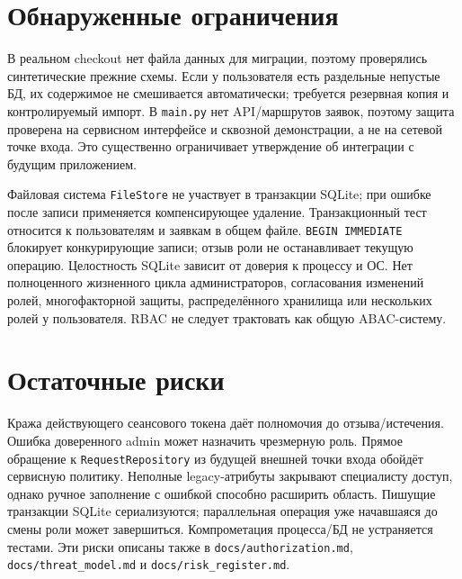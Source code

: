 \documentclass[12pt,a4paper]{article}
\begin{document}
\section{Обнаруженные ограничения}
В реальном checkout нет файла данных для миграции, поэтому проверялись синтетические прежние схемы. Если у пользователя есть раздельные непустые БД, их содержимое не смешивается автоматически; требуется резервная копия и контролируемый импорт. В \texttt{main.py} нет API/маршрутов заявок, поэтому защита проверена на сервисном интерфейсе и сквозной демонстрации, а не на сетевой точке входа. Это существенно ограничивает утверждение об интеграции с будущим приложением.

Файловая система \texttt{FileStore} не участвует в транзакции SQLite; при ошибке после записи применяется компенсирующее удаление. Транзакционный тест относится к пользователям и заявкам в общем файле. \texttt{BEGIN IMMEDIATE} блокирует конкурирующие записи; отзыв роли не останавливает текущую операцию. Целостность SQLite зависит от доверия к процессу и ОС. Нет полноценного жизненного цикла администраторов, согласования изменений ролей, многофакторной защиты, распределённого хранилища или нескольких ролей у пользователя. RBAC не следует трактовать как общую ABAC-систему.

\section{Остаточные риски}
Кража действующего сеансового токена даёт полномочия до отзыва/истечения. Ошибка доверенного admin может назначить чрезмерную роль. Прямое обращение к \texttt{RequestRepository} из будущей внешней точки входа обойдёт сервисную политику. Неполные legacy-атрибуты закрывают специалисту доступ, однако ручное заполнение с ошибкой способно расширить область. Пишущие транзакции SQLite сериализуются; параллельная операция уже начавшаяся до смены роли может завершиться. Компрометация процесса/БД не устраняется тестами. Эти риски описаны также в \texttt{docs/authorization.md}, \texttt{docs/threat\_model.md} и \texttt{docs/risk\_register.md}.
\end{document}

